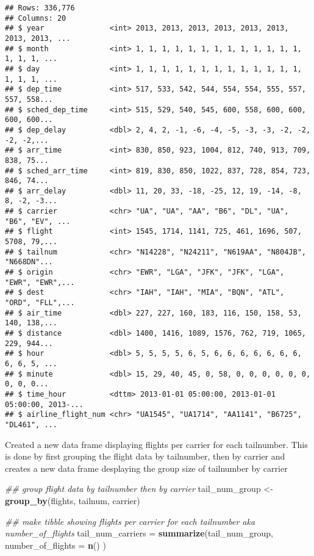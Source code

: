 \documentclass[
]{article}
\newenvironment{Shaded}{\begin{snugshade}}{\end{snugshade}}
\newcommand{\CommentTok}[1]{\textcolor[rgb]{0.56,0.35,0.01}{\textit{#1}}}
\newcommand{\DataTypeTok}[1]{\textcolor[rgb]{0.13,0.29,0.53}{#1}}
\newcommand{\KeywordTok}[1]{\textcolor[rgb]{0.13,0.29,0.53}{\textbf{#1}}}
\newcommand{\NormalTok}[1]{#1}
\newcommand{\StringTok}[1]{\textcolor[rgb]{0.31,0.60,0.02}{#1}}
\begin{document}
\begin{verbatim}
## Rows: 336,776
## Columns: 20
## $ year               <int> 2013, 2013, 2013, 2013, 2013, 2013, 2013, 2013, ...
## $ month              <int> 1, 1, 1, 1, 1, 1, 1, 1, 1, 1, 1, 1, 1, 1, 1, 1, ...
## $ day                <int> 1, 1, 1, 1, 1, 1, 1, 1, 1, 1, 1, 1, 1, 1, 1, 1, ...
## $ dep_time           <int> 517, 533, 542, 544, 554, 554, 555, 557, 557, 558...
## $ sched_dep_time     <int> 515, 529, 540, 545, 600, 558, 600, 600, 600, 600...
## $ dep_delay          <dbl> 2, 4, 2, -1, -6, -4, -5, -3, -3, -2, -2, -2, -2,...
## $ arr_time           <int> 830, 850, 923, 1004, 812, 740, 913, 709, 838, 75...
## $ sched_arr_time     <int> 819, 830, 850, 1022, 837, 728, 854, 723, 846, 74...
## $ arr_delay          <dbl> 11, 20, 33, -18, -25, 12, 19, -14, -8, 8, -2, -3...
## $ carrier            <chr> "UA", "UA", "AA", "B6", "DL", "UA", "B6", "EV", ...
## $ flight             <int> 1545, 1714, 1141, 725, 461, 1696, 507, 5708, 79,...
## $ tailnum            <chr> "N14228", "N24211", "N619AA", "N804JB", "N668DN"...
## $ origin             <chr> "EWR", "LGA", "JFK", "JFK", "LGA", "EWR", "EWR",...
## $ dest               <chr> "IAH", "IAH", "MIA", "BQN", "ATL", "ORD", "FLL",...
## $ air_time           <dbl> 227, 227, 160, 183, 116, 150, 158, 53, 140, 138,...
## $ distance           <dbl> 1400, 1416, 1089, 1576, 762, 719, 1065, 229, 944...
## $ hour               <dbl> 5, 5, 5, 5, 6, 5, 6, 6, 6, 6, 6, 6, 6, 6, 6, 5, ...
## $ minute             <dbl> 15, 29, 40, 45, 0, 58, 0, 0, 0, 0, 0, 0, 0, 0, 0...
## $ time_hour          <dttm> 2013-01-01 05:00:00, 2013-01-01 05:00:00, 2013-...
## $ airline_flight_num <chr> "UA1545", "UA1714", "AA1141", "B6725", "DL461", ...
\end{verbatim}

Created a new data frame displaying flights per carrier for each
tailnumber. This is done by first grouping the flight data by
tailnumber, then by carrier and creates a new data frame desplaying the
group size of tailnumber by carrier

\begin{Shaded}
\begin{Highlighting}[]
\CommentTok{## group flight data by tailnumber then by carrier}
\NormalTok{tail_num_group <-}\StringTok{ }\KeywordTok{group_by}\NormalTok{(flights, tailnum, carrier)}

\CommentTok{## make tibble showing flights per carrier for each tailnumber aka number_of_flights}
\NormalTok{tail_num_carriers =}\StringTok{ }\KeywordTok{summarize}\NormalTok{(tail_num_group, }\DataTypeTok{number_of_flights =} \KeywordTok{n}\NormalTok{() )}
\end{Highlighting}
\end{Shaded}
\end{document}
